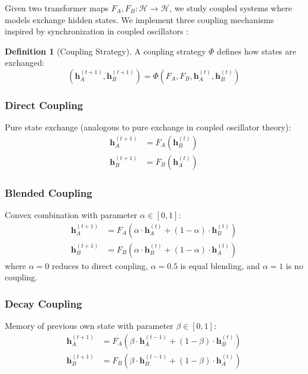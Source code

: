 \documentclass[10pt]{article} %
\theoremstyle{plain}
\theoremstyle{definition}
\newtheorem{definition}[theorem]{Definition}
\theoremstyle{remark}
\newcommand{\cH}{\mathcal{H}}
\newcommand{\vect}[1]{\bm{#1}}
\begin{document}
Given two transformer maps $F_A, F_B: \cH \to \cH$, we study coupled systems where models exchange hidden states. We implement three coupling mechanisms inspired by synchronization in coupled oscillators \citep{kuramoto1984chemical}:

\begin{definition}[Coupling Strategy]
A coupling strategy $\Phi$ defines how states are exchanged:
\begin{equation}
    (\vect{h}_A^{(t+1)}, \vect{h}_B^{(t+1)}) = \Phi(F_A, F_B, \vect{h}_A^{(t)}, \vect{h}_B^{(t)})
\end{equation}
\end{definition}

\subsubsection{Direct Coupling}
Pure state exchange (analogous to pure exchange in coupled oscillator theory):
\begin{align}
    \vect{h}_A^{(t+1)} &= F_A(\vect{h}_B^{(t)}) \\
    \vect{h}_B^{(t+1)} &= F_B(\vect{h}_A^{(t)})
\end{align}

\subsubsection{Blended Coupling}
Convex combination with parameter $\alpha \in [0,1]$:
\begin{align}
    \vect{h}_A^{(t+1)} &= F_A(\alpha \cdot \vect{h}_A^{(t)} + (1-\alpha) \cdot \vect{h}_B^{(t)}) \\
    \vect{h}_B^{(t+1)} &= F_B(\alpha \cdot \vect{h}_B^{(t)} + (1-\alpha) \cdot \vect{h}_A^{(t)})
\end{align}
where $\alpha = 0$ reduces to direct coupling, $\alpha = 0.5$ is equal blending, and $\alpha = 1$ is no coupling.

\subsubsection{Decay Coupling}
Memory of previous own state with parameter $\beta \in [0,1]$:
\begin{align}
    \vect{h}_A^{(t+1)} &= F_A(\beta \cdot \vect{h}_A^{(t-1)} + (1-\beta) \cdot \vect{h}_B^{(t)}) \\
    \vect{h}_B^{(t+1)} &= F_B(\beta \cdot \vect{h}_B^{(t-1)} + (1-\beta) \cdot \vect{h}_A^{(t)})
\end{align}
\end{document}

